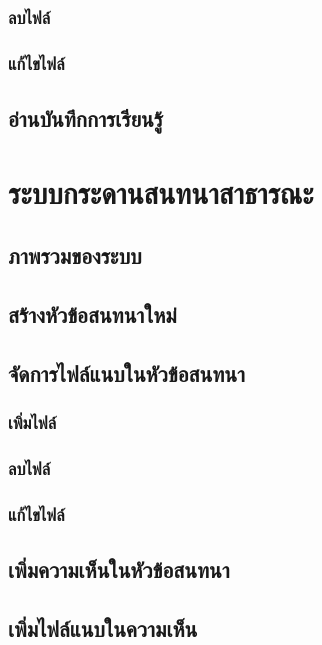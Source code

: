 \documentclass[12pt,oneside]{book}
\begin{document}
\subsection{ลบไฟล์}

\subsection{แก้ไขไฟล์}

\section{อ่านบันทึกการเรียนรู้}

\chapter{ระบบกระดานสนทนาสาธารณะ}

\section{ภาพรวมของระบบ}

\section{สร้างหัวข้อสนทนาใหม่}

\section{จัดการไฟล์แนบในหัวข้อสนทนา}

\subsection{เพิ่มไฟล์}

\subsection{ลบไฟล์}

\subsection{แก้ไขไฟล์}

\section{เพิ่มความเห็นในหัวข้อสนทนา}

\section{เพิ่มไฟล์แนบในความเห็น}
\end{document}
